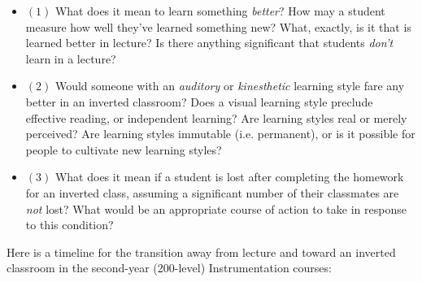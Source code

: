 \begin{itemize}
\item{$(1)$} What does it mean to learn something {\it better}?  How may a student measure how well they've learned something new?  What, exactly, is it that is learned better in lecture?  Is there anything significant that students {\it don't} learn in a lecture?
\vskip 5pt
\item{$(2)$} Would someone with an {\it auditory} or {\it kinesthetic} learning style fare any better in an inverted classroom?  Does a visual learning style preclude effective reading, or independent learning?  Are learning styles real or merely perceived?  Are learning styles immutable (i.e. permanent), or is it possible for people to cultivate new learning styles?
\vskip 5pt
\item{$(3)$} What does it mean if a student is lost after completing the homework for an inverted class, assuming a significant number of their classmates are {\it not} lost?  What would be an appropriate course of action to take in response to this condition?
\end{itemize}

\vskip 10pt














Here is a timeline for the transition away from lecture and toward an inverted classroom in the second-year (200-level) Instrumentation courses:

